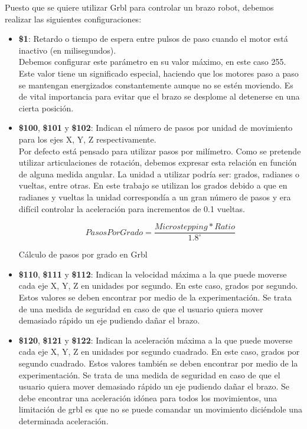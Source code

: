 Puesto que se quiere utilizar Grbl para controlar un brazo robot, debemos 
realizar las siguientes configuraciones:
\begin{itemize}
\item \textbf{\$1}: Retardo o tiempo de espera entre pulsos de paso cuando el motor está inactivo (en milisegundos). 
\\Debemos configurar 
este parámetro en su valor máximo, en este caso 255. Este valor tiene un significado especial, haciendo que los motores paso a paso 
se mantengan energizados constantemente aunque no se estén moviendo. Es de vital importancia para evitar que el brazo se desplome al detenerse en una cierta posición.  
\item \textbf{\$100}, \textbf{\$101} y \textbf{\$102}: Indican el número de pasos por unidad de movimiento para los ejes X, Y, Z respectivamente. 
\\Por defecto está pensado para utilizar pasos por milímetro. Como se pretende utilizar articulaciones de rotación, debemos expresar esta relación 
en función de alguna medida angular. La unidad a utilizar podría ser: grados, radianes o vueltas, entre otras. En este trabajo se 
utilizan los grados debido a que en radianes y vueltas la unidad correspondía a un gran número de pasos y era difícil controlar la aceleración para incrementos de 
0.1 vueltas. 

\begin{myequation}[h!]
\begin{equation}
    PasosPorGrado = \frac{Microstepping * Ratio}{1.8^\circ}
\nonumber
\label{ec:pasos_por_grado}
\end{equation}
\caption[Cálculo de pasos por grado en Grbl]{Cálculo de pasos por grado en Grbl}
\end{myequation} 

\item \textbf{\$110}, \textbf{\$111} y \textbf{\$112}: Indican la velocidad máxima a la que puede moverse cada eje X, Y, Z en unidades por segundo. 
En este caso, grados por segundo. Estos valores se deben encontrar por medio de la experimentación. Se trata de una medida de seguridad en 
caso de que el usuario quiera mover demasiado rápido un eje pudiendo dañar el brazo.

\item \textbf{\$120}, \textbf{\$121} y \textbf{\$122}: Indican la aceleración máxima a la que puede moverse cada eje X, Y, Z en unidades por segundo cuadrado. 
En este caso, grados por segundo cuadrado. Estos valores también se deben encontrar por medio de la experimentación. Se trata de una medida de seguridad en 
caso de que el usuario quiera mover demasiado rápido un eje pudiendo dañar el brazo. Se debe encontrar una aceleración idónea para todos 
los movimientos, una limitación de grbl es que no se puede comandar un movimiento diciéndole una determinada aceleración.
\end{itemize}

